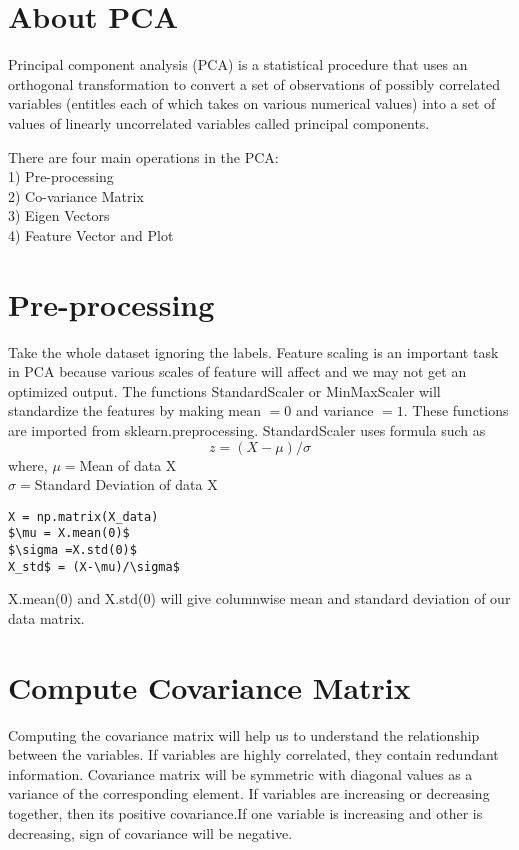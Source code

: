 \documentclass[journal,12pt,twocolumn]{IEEEtran}
\begin{document}
\section{About PCA}
Principal component analysis (PCA) is a statistical procedure that uses an orthogonal transformation to convert a set of observations of possibly correlated variables (entitles each of which takes on various numerical values) into a set of values of linearly uncorrelated variables called principal components.


There are four main operations in the PCA:\\
	1) Pre-processing\\
	2) Co-variance Matrix\\
	3) Eigen Vectors\\
	4) Feature Vector and Plot

\section{Pre-processing}
Take the whole dataset ignoring the labels. Feature scaling is an important task in PCA because various scales of feature will affect and we may not get an optimized output. The functions  StandardScaler or MinMaxScaler will standardize the features by making mean $=0$ and variance $=1$. These functions are imported from sklearn.preprocessing. 
StandardScaler uses formula such as 
$$ z = (X-\mu)/\sigma$$
where, $\mu = $Mean of data X\\
$\sigma =$Standard Deviation of data X\\

\begin{lstlisting}[mathescape=true]
X = np.matrix(X_data)
$\mu = X.mean(0)$
$\sigma =X.std(0)$
X_std$ = (X-\mu)/\sigma$
\end{lstlisting}

X.mean(0) and X.std(0) will give columnwise mean and standard deviation of our data matrix.

\section{Compute Covariance Matrix}
Computing the covariance matrix will help us to understand the relationship between the variables. If variables are highly correlated, they contain redundant information. Covariance matrix will be symmetric with diagonal values as a variance of the corresponding element. If variables are increasing or decreasing together, then its positive covariance.If one variable is increasing and other is decreasing, sign of covariance will be negative.
 
\end{document}
